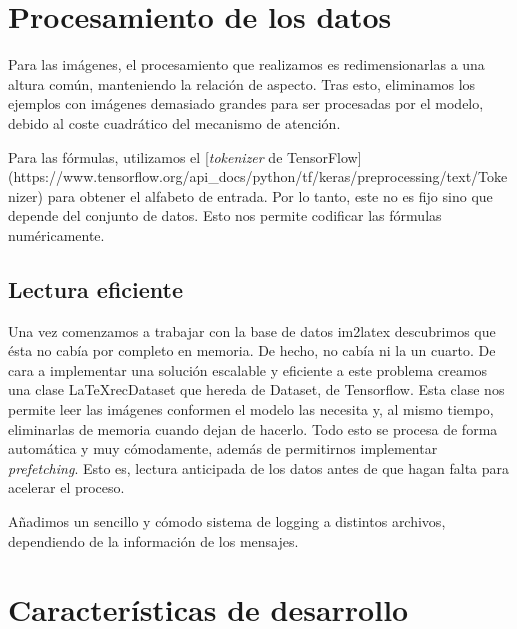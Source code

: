 \documentclass[a4paper, 20pt, dvipsnames]{article}
\begin{document}
\section{Procesamiento de los datos}

Para las imágenes, el procesamiento que realizamos es redimensionarlas a una altura común, manteniendo la relación de aspecto. Tras esto, eliminamos los ejemplos con imágenes demasiado grandes para ser procesadas por el modelo, debido al coste cuadrático del mecanismo de atención.

Para las fórmulas, utilizamos el [\emph{tokenizer} de TensorFlow](https://www.tensorflow.org/api\_docs/python/tf/keras/preprocessing/text/Tokenizer) para obtener el alfabeto de entrada. Por lo tanto, este no es fijo sino que depende del conjunto de datos. Esto nos permite codificar las fórmulas numéricamente.


\subsection{Lectura eficiente}

Una vez comenzamos a trabajar con la base de datos im2latex descubrimos que ésta no cabía por completo en memoria. De hecho, no cabía ni la un cuarto. De cara a implementar una solución escalable y eficiente a este problema creamos una clase LaTeXrecDataset que hereda de Dataset, de Tensorflow. Esta clase nos permite leer las imágenes conformen el modelo las necesita y, al mismo tiempo, eliminarlas de memoria cuando dejan de hacerlo. Todo esto se procesa de forma automática y muy cómodamente, además de permitirnos implementar \emph{prefetching}. Esto es, lectura anticipada de los datos antes de que hagan falta para acelerar el proceso.


Añadimos un sencillo y cómodo sistema de logging a distintos archivos, dependiendo de la información de los mensajes. %


\section{Características de desarrollo}

\end{document}
